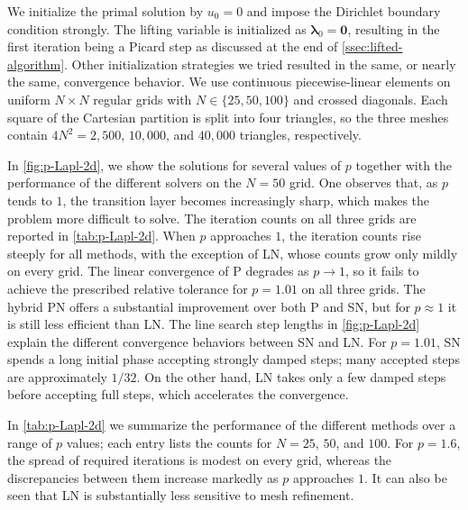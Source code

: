 \documentclass[11pt,pdflatex,sn-mathphys-num]{sn-jnl}
\theoremstyle{thmstyleone}%
\theoremstyle{thmstyletwo}%
\theoremstyle{thmstylethree}%
\newcommand{\bs}[1]{\ensuremath{\boldsymbol{#1}}}
\begin{document}
We initialize the primal solution by $u_0=0$ and impose the 
Dirichlet boundary condition strongly. The lifting variable is initialized as $\bs\lambda_0=\bs 0$, resulting in the first iteration being a Picard step as discussed at the end of \cref{ssec:lifted-algorithm}. Other initialization strategies we tried resulted in the same, or nearly the same, convergence behavior.
We use continuous piecewise-linear elements on uniform $N\times N$ regular grids with $N\in\{25,50,100\}$ and crossed diagonals. Each square of the Cartesian partition is split into four triangles, so the three meshes contain $4N^2=2{,}500$, $10{,}000$, and $40{,}000$ triangles, respectively.

In \cref{fig:p-Lapl-2d}, we show the solutions for several values of $p$ together with the performance of the different solvers on the $N=50$ grid. One observes that, as $p$ tends to $1$, the transition layer becomes increasingly sharp, which makes the problem more difficult to solve. The iteration counts on all three grids are reported in \cref{tab:p-Lapl-2d}.
When $p$ approaches $1$, the iteration counts rise steeply for all methods, with the exception of LN, whose counts grow only mildly on every grid. The linear convergence of P degrades as $p\to 1$, so it fails to achieve the prescribed relative tolerance for $p=1.01$ on all three grids. The hybrid PN offers a substantial improvement over both P and SN, but for $p\approx 1$ it is still less efficient than LN.
The line search step lengths in \cref{fig:p-Lapl-2d} explain the different convergence behaviors between SN and LN. For $p=1.01$, SN spends a long initial phase accepting strongly damped steps; many accepted steps are approximately $1/32$. On the other hand, LN takes only a few damped steps before accepting full steps, which accelerates the convergence.

In \cref{tab:p-Lapl-2d} we summarize the performance of the different methods over a range of $p$ values; each entry lists the counts for $N=25$, $50$, and $100$. For $p=1.6$, the spread of required iterations is modest on every grid, whereas the discrepancies between them increase markedly as $p$ approaches $1$. It can also be seen that LN is substantially less sensitive to mesh refinement.
\end{document}
